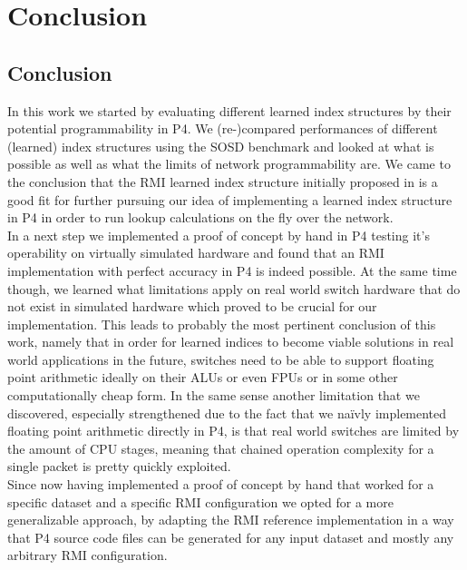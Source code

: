 
\chapter{Conclusion}
\label{ch:conclusions}

\section{Conclusion}
In this work we started by evaluating different learned index structures by their potential programmability in P4. We (re-)compared performances of different (learned) index structures using the SOSD benchmark \cite{sosd-vldb} and looked at what is possible as well as what the limits of network programmability are. We came to the conclusion that the RMI learned index structure initially proposed in \cite{rmi} is a good fit for further pursuing our idea of implementing a learned index structure in P4 in order to run lookup calculations on the fly over the network.\\

In a next step we implemented a proof of concept by hand in P4 testing it's operability on virtually simulated hardware and found that an RMI implementation with perfect accuracy in P4 is indeed possible. At the same time though, we learned what limitations apply on real world switch hardware that do not exist in simulated hardware which proved to be crucial for our implementation. This leads to probably the most pertinent conclusion of this work, namely that in order for learned indices to become viable solutions in real world applications in the future, switches need to be able to support floating point arithmetic ideally on their ALUs or even FPUs or in some other computationally cheap form. In the same sense another limitation that we discovered, especially strengthened due to the fact that we naïvly implemented floating point arithmetic directly in P4, is that real world switches are limited by the amount of CPU stages, meaning that chained operation complexity for a single packet is pretty quickly exploited.\\

Since now having implemented a proof of concept by hand that worked for a specific dataset and a specific RMI configuration we opted for a more generalizable approach, by adapting the RMI reference implementation \cite{cdfshop} in a way that P4 source code files can be generated for any input dataset and mostly any arbitrary RMI configuration.\\

